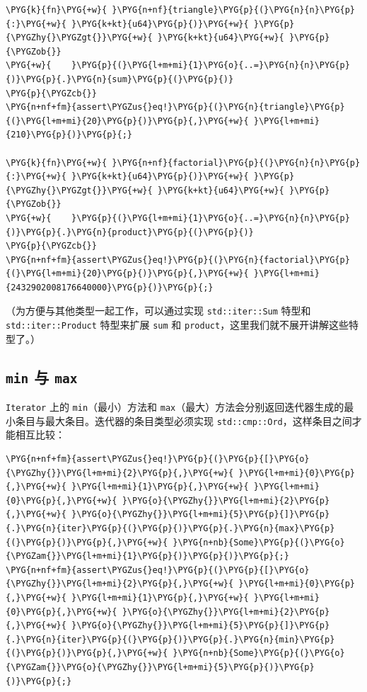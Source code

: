 \begin{Verbatim}[commandchars=\\\{\},breaklines=true,breakanywhere=true,fontsize=\codefont,xleftmargin=17bp]
\PYG{k}{fn}\PYG{+w}{ }\PYG{n+nf}{triangle}\PYG{p}{(}\PYG{n}{n}\PYG{p}{:}\PYG{+w}{ }\PYG{k+kt}{u64}\PYG{p}{)}\PYG{+w}{ }\PYG{p}{\PYGZhy{}\PYGZgt{}}\PYG{+w}{ }\PYG{k+kt}{u64}\PYG{+w}{ }\PYG{p}{\PYGZob{}}
\PYG{+w}{    }\PYG{p}{(}\PYG{l+m+mi}{1}\PYG{o}{..=}\PYG{n}{n}\PYG{p}{)}\PYG{p}{.}\PYG{n}{sum}\PYG{p}{(}\PYG{p}{)}
\PYG{p}{\PYGZcb{}}
\PYG{n+nf+fm}{assert\PYGZus{}eq!}\PYG{p}{(}\PYG{n}{triangle}\PYG{p}{(}\PYG{l+m+mi}{20}\PYG{p}{)}\PYG{p}{,}\PYG{+w}{ }\PYG{l+m+mi}{210}\PYG{p}{)}\PYG{p}{;}

\PYG{k}{fn}\PYG{+w}{ }\PYG{n+nf}{factorial}\PYG{p}{(}\PYG{n}{n}\PYG{p}{:}\PYG{+w}{ }\PYG{k+kt}{u64}\PYG{p}{)}\PYG{+w}{ }\PYG{p}{\PYGZhy{}\PYGZgt{}}\PYG{+w}{ }\PYG{k+kt}{u64}\PYG{+w}{ }\PYG{p}{\PYGZob{}}
\PYG{+w}{    }\PYG{p}{(}\PYG{l+m+mi}{1}\PYG{o}{..=}\PYG{n}{n}\PYG{p}{)}\PYG{p}{.}\PYG{n}{product}\PYG{p}{(}\PYG{p}{)}
\PYG{p}{\PYGZcb{}}
\PYG{n+nf+fm}{assert\PYGZus{}eq!}\PYG{p}{(}\PYG{n}{factorial}\PYG{p}{(}\PYG{l+m+mi}{20}\PYG{p}{)}\PYG{p}{,}\PYG{+w}{ }\PYG{l+m+mi}{2432902008176640000}\PYG{p}{)}\PYG{p}{;}
\end{Verbatim}

（为方便与其他类型一起工作，可以通过实现 \texttt{std::iter::Sum} 特型和 \texttt{std::iter::Product} 特型来扩展 \texttt{sum} 和 \texttt{product}，这里我们就不展开讲解这些特型了。）

\subsection{\texttt{min} 与 \texttt{max}}

\texttt{Iterator} 上的 \texttt{min}（最小）方法和 \texttt{max}（最大）方法会分别返回迭代器生成的最小条目与最大条目。迭代器的条目类型必须实现 \texttt{std::cmp::Ord}，这样条目之间才能相互比较：

\begin{Verbatim}[commandchars=\\\{\},breaklines=true,breakanywhere=true,fontsize=\codefont,xleftmargin=17bp]
\PYG{n+nf+fm}{assert\PYGZus{}eq!}\PYG{p}{(}\PYG{p}{[}\PYG{o}{\PYGZhy{}}\PYG{l+m+mi}{2}\PYG{p}{,}\PYG{+w}{ }\PYG{l+m+mi}{0}\PYG{p}{,}\PYG{+w}{ }\PYG{l+m+mi}{1}\PYG{p}{,}\PYG{+w}{ }\PYG{l+m+mi}{0}\PYG{p}{,}\PYG{+w}{ }\PYG{o}{\PYGZhy{}}\PYG{l+m+mi}{2}\PYG{p}{,}\PYG{+w}{ }\PYG{o}{\PYGZhy{}}\PYG{l+m+mi}{5}\PYG{p}{]}\PYG{p}{.}\PYG{n}{iter}\PYG{p}{(}\PYG{p}{)}\PYG{p}{.}\PYG{n}{max}\PYG{p}{(}\PYG{p}{)}\PYG{p}{,}\PYG{+w}{ }\PYG{n+nb}{Some}\PYG{p}{(}\PYG{o}{\PYGZam{}}\PYG{l+m+mi}{1}\PYG{p}{)}\PYG{p}{)}\PYG{p}{;}
\PYG{n+nf+fm}{assert\PYGZus{}eq!}\PYG{p}{(}\PYG{p}{[}\PYG{o}{\PYGZhy{}}\PYG{l+m+mi}{2}\PYG{p}{,}\PYG{+w}{ }\PYG{l+m+mi}{0}\PYG{p}{,}\PYG{+w}{ }\PYG{l+m+mi}{1}\PYG{p}{,}\PYG{+w}{ }\PYG{l+m+mi}{0}\PYG{p}{,}\PYG{+w}{ }\PYG{o}{\PYGZhy{}}\PYG{l+m+mi}{2}\PYG{p}{,}\PYG{+w}{ }\PYG{o}{\PYGZhy{}}\PYG{l+m+mi}{5}\PYG{p}{]}\PYG{p}{.}\PYG{n}{iter}\PYG{p}{(}\PYG{p}{)}\PYG{p}{.}\PYG{n}{min}\PYG{p}{(}\PYG{p}{)}\PYG{p}{,}\PYG{+w}{ }\PYG{n+nb}{Some}\PYG{p}{(}\PYG{o}{\PYGZam{}}\PYG{o}{\PYGZhy{}}\PYG{l+m+mi}{5}\PYG{p}{)}\PYG{p}{)}\PYG{p}{;}
\end{Verbatim}

